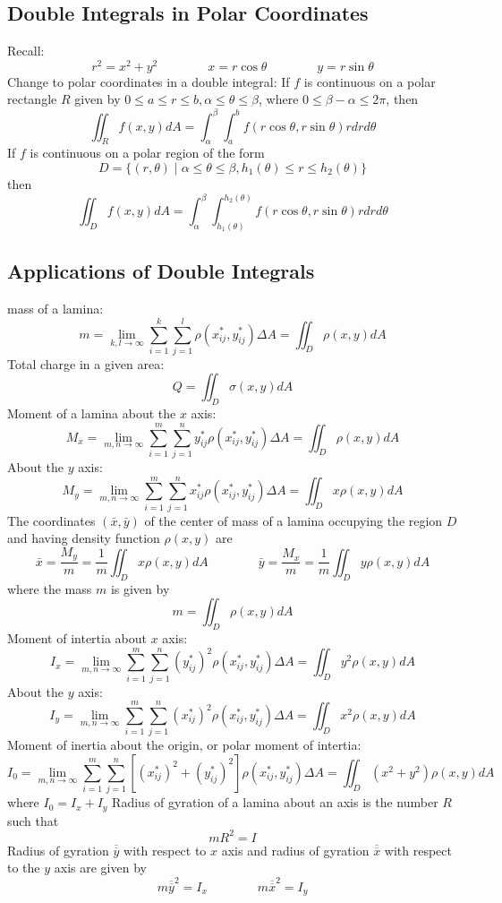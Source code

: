 \documentclass{article}
\begin{document}
    \subsection{Double Integrals in Polar Coordinates}
    \begin{outline}
        \1 Recall: \[r^2=x^2+y^2\qquad\qquad x=r\cos\theta\qquad\qquad y=r\sin\theta\]
        \1 Change to polar coordinates in a double integral: If $f$ is continuous on a polar rectangle $R$ given by \(0\leq a\leq r\leq b,\alpha\leq\theta\leq\beta\), where \(0\leq\beta-\alpha\leq2\pi\), then \[\iint_Rf(x,y)dA=\int^\beta_\alpha\int^b_af(r\cos\theta,r\sin\theta)rdrd\theta\]
        \1 If $f$ is continuous on a polar region of the form \[D=\{(r,\theta)\;|\;\alpha\leq\theta\leq\beta,h_1(\theta)\leq r\leq h_2(\theta)\}\] then \[\iint_Df(x,y)dA=\int^\beta_\alpha\int^{h_2(\theta)}_{h_1(\theta)}f(r\cos\theta,r\sin\theta)rdrd\theta\]
    \end{outline}
    \subsection{Applications of Double Integrals}
    \begin{outline}
        \1 mass of a lamina: \[m=\lim_{k,l\to\infty}\sum^k_{i=1}\sum^l_{j=1}\rho(x^*_{ij},y^*_{ij})\Delta A=\iint_D\rho(x,y)dA\]
        \1 Total charge in a given area: \[Q=\iint_D\sigma(x,y)dA\]
        \1 Moment of a lamina about the $x$ axis: \[M_x=\lim_{m,n\to\infty}\sum^m_{i=1}\sum^n_{j=1}y^*_{ij}\rho(x^*_{ij},y^*_{ij})\Delta A=\iint_D\rho(x,y)dA\]
        \1 About the $y$ axis: \[M_y=\lim_{m,n\to\infty}\sum^m_{i=1}\sum^n_{j=1}x^*_{ij}\rho(x^*_{ij},y^*_{ij})\Delta A=\iint_Dx\rho(x,y)dA\]
        \1 The coordinates \((\bar x,\bar y)\) of the center of mass of a lamina occupying the region $D$ and having density function \(\rho(x,y)\) are \[\bar x=\dfrac{M_y}{m}=\dfrac{1}{m}\iint_Dx\rho(x,y)dA\qquad\qquad\bar y=\dfrac{M_x}{m}=\dfrac{1}{m}\iint_Dy\rho(x,y)dA\] where the mass $m$ is given by \[m=\iint_D\rho(x,y)dA\]
        \1 Moment of intertia about $x$ axis: \[I_x=\lim_{m,n\to\infty}\sum^m_{i=1}\sum^n_{j=1}(y^*_{ij})^2\rho(x^*_{ij},y^*_{ij})\Delta A=\iint_Dy^2\rho(x,y)dA\]
        \1 About the $y$ axis: \[I_y=\lim_{m,n\to\infty}\sum^m_{i=1}\sum^n_{j=1}(x^*_{ij})^2\rho(x^*_{ij},y^*_{ij})\Delta A=\iint_Dx^2\rho(x,y)dA\]
        \1 Moment of inertia about the origin, or polar moment of intertia: \[I_0=\lim_{m,n\to\infty}\sum^m_{i=1}\sum^n_{j=1}\left[(x^*_{ij})^2+(y^*_{ij})^2\right]\rho(x^*_{ij},y^*_{ij})\Delta A=\iint_D(x^2+y^2)\rho(x,y)dA\] where \(I_0=I_x+I_y\)
        \1 Radius of gyration of a lamina about an axis is the number $R$ such that \[mR^2=I\]
        \1 Radius of gyration \(\overline{\overline{y}}\) with respect to $x$ axis and radius of gyration \(\overline{\overline{x}}\) with respect to the $y$ axis are given by \[m\overline{\overline{y}}^2=I_x\qquad\qquad m\overline{\overline{x}}^2=I_y\]


    \end{outline}
\end{document}
